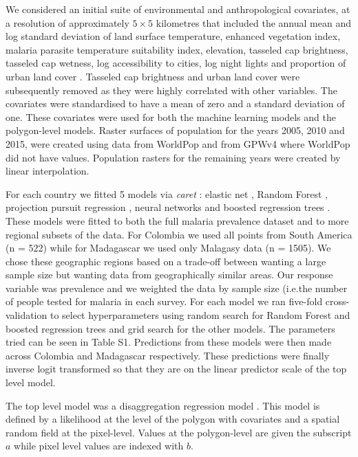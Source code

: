 \documentclass[11pt]{article}
\begin{document}
We considered an initial suite of environmental and anthropological covariates, at a resolution of approximately $5 \times 5$ kilometres that included the annual mean and log standard deviation of land surface temperature, enhanced vegetation index, malaria parasite temperature suitability index, elevation, tasseled cap brightness, tasseled cap wetness, log accessibility to cities, log night lights and proportion of urban land cover \citep{weiss2015re}. 
Tasseled cap brightness and urban land cover were subsequently removed as they were highly correlated with other variables. 
The covariates were standardised to have a mean of zero and a standard deviation of one. 
These covariates were used for both the machine learning models and the polygon-level models.
Raster surfaces of population for the years 2005, 2010 and 2015, were created using data from WorldPop \citep{tatem2017worldpop} and from GPWv4 \citep{gpw4} where WorldPop did not have values. 
Population rasters for the remaining years were created by linear interpolation. 


For each country we fitted 5 models via \emph{caret} \citep{caret}: elastic net \citep{enet}, Random Forest \citep{wright2015ranger}, projection pursuit regression \citep{friedman1981projection}, neural networks \citep{nnet} and boosted regression trees \citep{gbm}.
These models were fitted to both the full malaria prevalence dataset and to more regional subsets of the data.
For Colombia we used all points from South America (n = 522) while for Madagascar we used only Malagasy data (n = 1505).
We chose these geographic regions based on a trade-off between wanting a large sample size but wanting data from geographically similar areas.
Our response variable was prevalence and we weighted the data by sample size (i.e.\thinspace the number of people tested for malaria in each survey.
For each model we ran  five-fold cross-validation to select hyperparameters using random search for Random Forest and boosted regression trees and grid search for the other models. 
The parameters tried can be seen in Table S1.
Predictions from these models were then made across Colombia and Madagascar respectively.
These predictions were finally inverse logit transformed so that they are on the linear predictor scale of the top level model.

The top level model was a disaggregation regression model \citep{sturrock2014fine, wilson2017pointless, law2018variational, taylor2017continuous, li2012log}.
This model is defined by a likelihood at the level of the polygon with covariates and a spatial random field at the pixel-level. 
Values at the polygon-level are given the subscript $a$ while pixel level values are indexed with $b$.
\end{document}
